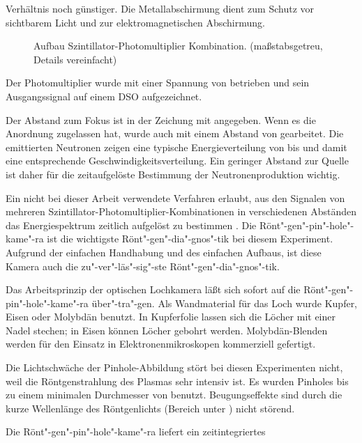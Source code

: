 Verhältnis noch günstiger. Die Metallabschirmung dient zum Schutz vor
sichtbarem Licht und zur elektromagnetischen Abschirmung.
%
\par
\begin{figure}[H]
  \center
  \caption{Aufbau Szintillator-Photomultiplier Kombination.
   (maßstabsgetreu, Details vereinfacht)}
  \label{fig:Photomultiplier}
\end{figure}
%
\par
Der Photomultiplier wurde mit einer Spannung von  betrieben
und sein Ausgangssignal auf einem DSO aufgezeichnet.
\par
Der Abstand zum Fokus ist in der Zeichung mit  angegeben.
Wenn es die Anordnung zugelassen hat, wurde auch mit einem Abstand von
 gearbeitet. Die emittierten Neutronen zeigen eine
typische Energieverteilung \cite{steinmetz:80} von  bis
 und damit eine entsprechende Geschwindigkeitsverteilung.
Ein geringer Abstand zur Quelle ist daher für die zeitaufgelöste
Bestimmung der Neutronenproduktion wichtig.
\par
Ein nicht bei dieser Arbeit verwendete Verfahren erlaubt, aus den
Signalen von mehreren Szintillator-Photomultiplier-Kombinationen in
verschiedenen Abständen das Energiespektrum zeitlich aufgelöst zu
bestimmen \cite{tiseanu:96}.
%
\label{pinholekamera}
%
Die Rönt"-gen"-pin"-hole"-kame"-ra ist die wichtigste
Rönt"-gen"-dia"-gnos"-tik bei diesem Experiment. Aufgrund der
einfachen Handhabung und des einfachen Aufbaus, ist diese Kamera
auch die zu"-ver"-läs"-sig"-ste Rönt"-gen"-dia"-gnos"-tik.
\par
Das Arbeitsprinzip der optischen Lochkamera läßt sich sofort auf
die Rönt"-gen"-pin"-hole"-kame"-ra über"-tra"-gen. Als
Wandmaterial für das Loch wurde Kupfer, Eisen oder Molybdän
benutzt. In Kupferfolie lassen sich die Löcher mit einer Nadel
stechen; in Eisen können Löcher gebohrt werden. Molybdän-Blenden
werden für den Einsatz in Elektronenmikroskopen kommerziell
gefertigt.
\par
Die Lichtschwäche der Pinhole-Abbildung stört bei diesen Experimenten
nicht, weil die Röntgenstrahlung des Plasmas sehr intensiv ist. Es
wurden Pinholes bis zu einem minimalen Durchmesser von
 benutzt. Beugungseffekte sind durch die kurze
Wellenlänge des Röntgenlichts (Bereich unter ) nicht
störend.
\par
Die Rönt"-gen"-pin"-hole"-kame"-ra liefert ein zeitintegriertes
